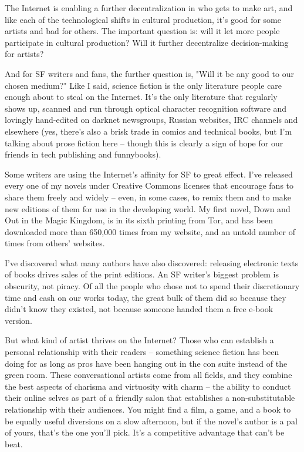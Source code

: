 The Internet is enabling a further decentralization in who gets to
make art, and like each of the technological shifts in cultural
production, it's good for some artists and bad for others. The
important question is: will it let more people participate in
cultural production? Will it further decentralize decision-making
for artists?

And for SF writers and fans, the further question is, "Will it be
any good to our chosen medium?" Like I said, science fiction is the
only literature people care enough about to steal on the Internet.
It's the only literature that regularly shows up, scanned and run
through optical character recognition software and lovingly
hand-edited on darknet newsgroups, Russian websites, IRC channels
and elsewhere (yes, there's also a brisk trade in comics and
technical books, but I'm talking about prose fiction here -- though
this is clearly a sign of hope for our friends in tech publishing
and funnybooks).

Some writers are using the Internet's affinity for SF to great
effect. I've released every one of my novels under Creative Commons
licenses that encourage fans to share them freely and widely --
even, in some cases, to remix them and to make new editions of them
for use in the developing world. My first novel, Down and Out in
the Magic Kingdom, is in its sixth printing from Tor, and has been
downloaded more than 650,000 times from my website, and an untold
number of times from others' websites.

I've discovered what many authors have also discovered: releasing
electronic texts of books drives sales of the print editions. An SF
writer's biggest problem is obscurity, not piracy. Of all the
people who chose not to spend their discretionary time and cash on
our works today, the great bulk of them did so because they didn't
know they existed, not because someone handed them a free e-book
version.

But what kind of artist thrives on the Internet? Those who can
establish a personal relationship with their readers -- something
science fiction has been doing for as long as pros have been
hanging out in the con suite instead of the green room. These
conversational artists come from all fields, and they combine the
best aspects of charisma and virtuosity with charm -- the ability
to conduct their online selves as part of a friendly salon that
establishes a non-substitutable relationship with their audiences.
You might find a film, a game, and a book to be equally useful
diversions on a slow afternoon, but if the novel's author is a pal
of yours, that's the one you'll pick. It's a competitive advantage
that can't be beat.

